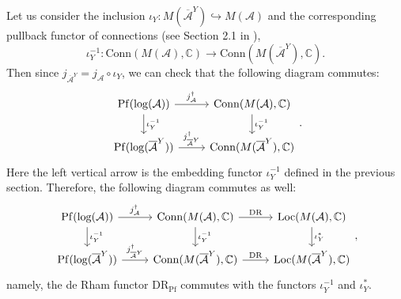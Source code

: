 \documentclass[a4paper,12pt]{article}
\theoremstyle{definition}
\theoremstyle{remark}
\begin{document}
Let us consider the inclusion $\iota_{Y}\colon M(\overline{\mathcal{A}}^{Y})\hookrightarrow M(\mathcal{A})$
and 
the corresponding pullback functor of connections (see Section 2.1 in \cite{DelEDR}),
\[
	\iota_{Y}^{-1}\colon \mathrm{Conn}(M(\mathcal{A}),\mathbb{C})\longrightarrow \mathrm{Conn}(M(\overline{\mathcal{A}}^{Y}),\mathbb{C}).
\]
Then since 
$j_{\overline{\mathcal{A}}^{Y}}=j_{\mathcal{A}}\circ \iota_{Y}$, 
we can check that the following diagram commutes:
\[\begin{tikzcd}
\mathrm{Pf}(\mathrm{log}(\mathcal{A}))\arrow[r,"j_{\mathcal{A}}^{\dagger}"]\arrow[d,"\iota_{Y}^{-1}"]&
\mathrm{Conn}(M(\mathcal{A}),\mathbb{C})\arrow[d,"\iota_{Y}^{-1}"]\\
\mathrm{Pf}(\mathrm{log}(\overline{\mathcal{A}}^{Y}))\arrow[r,"j_{\overline{\mathcal{A}}^{Y}}^{\dagger}"]&
\mathrm{Conn}(M(\overline{\mathcal{A}}^{Y}),\mathbb{C})
\end{tikzcd}.
\]
Here the left vertical arrow is the embedding functor $\iota_{Y}^{-1}$ defined in the previous section.
Therefore, the following diagram commutes as well:
\[\begin{tikzcd}
\mathrm{Pf}(\mathrm{log}(\mathcal{A}))\arrow[r,"j_{\mathcal{A}}^{\dagger}"]\arrow[d,"\iota_{Y}^{-1}"]&
\mathrm{Conn}(M(\mathcal{A}),\mathbb{C})\arrow[d,"\iota_{Y}^{-1}"]\arrow[r,"\mathrm{DR}"]&
\mathrm{Loc}(M(\mathcal{A}),\mathbb{C})\arrow[d,"\iota_{Y}^{*}"]\\
\mathrm{Pf}(\mathrm{log}(\overline{\mathcal{A}}^{Y}))\arrow[r,"j_{\overline{\mathcal{A}}^{Y}}^{\dagger}"]&
\mathrm{Conn}(M(\overline{\mathcal{A}}^{Y}),\mathbb{C})\arrow[r,"\mathrm{DR}"]&
\mathrm{Loc}(M(\overline{\mathcal{A}}^{Y}),\mathbb{C})
\end{tikzcd},
\]
namely, the de Rham functor $\mathrm{DR}_{\mathrm{Pf}}$ commutes with the functors $\iota_{Y}^{-1}$ and $\iota_{Y}^{*}$.
\end{document}
